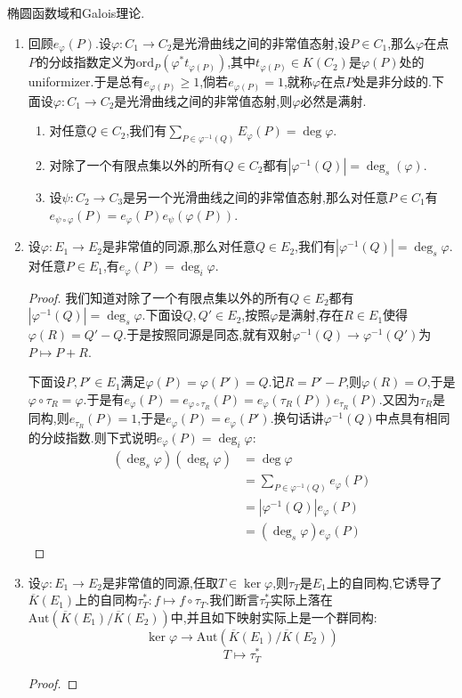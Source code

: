 椭圆函数域和Galois理论.
\begin{enumerate}
	\item 回顾$e_{\varphi}(P)$.设$\varphi:C_1\to C_2$是光滑曲线之间的非常值态射,设$P\in C_1$,那么$\varphi$在点$P$的分歧指数定义为$\mathrm{ord}_P(\varphi^*t_{\varphi(P)})$,其中$t_{\varphi(P)}\in K(C_2)$是$\varphi(P)$处的uniformizer.于是总有$e_{\varphi(P)}\ge1$,倘若$e_{\varphi(P)}=1$,就称$\varphi$在点$P$处是非分歧的.下面设$\varphi:C_1\to C_2$是光滑曲线之间的非常值态射,则$\varphi$必然是满射.
	\begin{enumerate}
		\item 对任意$Q\in C_2$,我们有$\sum_{P\in\varphi^{-1}(Q)}E_{\varphi}(P)=\deg\varphi$.
		\item 对除了一个有限点集以外的所有$Q\in C_2$都有$|\varphi^{-1}(Q)|=\deg_s(\varphi)$.
		\item 设$\psi:C_2\to C_3$是另一个光滑曲线之间的非常值态射,那么对任意$P\in C_1$有$e_{\psi\circ\varphi}(P)=e_{\varphi}(P)e_{\psi}(\varphi(P))$.
	\end{enumerate}
	\item 设$\varphi:E_1\to E_2$是非常值的同源,那么对任意$Q\in E_2$,我们有$|\varphi^{-1}(Q)|=\deg_s\varphi$.对任意$P\in E_1$,有$e_{\varphi}(P)=\deg_i\varphi$.
	\begin{proof}
		
		我们知道对除了一个有限点集以外的所有$Q\in E_2$都有$|\varphi^{-1}(Q)|=\deg_s\varphi$.下面设$Q,Q'\in E_2$,按照$\varphi$是满射,存在$R\in E_1$使得$\varphi(R)=Q'-Q$.于是按照同源是同态,就有双射$\varphi^{-1}(Q)\to\varphi^{-1}(Q')$为$P\mapsto P+R$.
		
		\qquad
		
		下面设$P,P'\in E_1$满足$\varphi(P)=\varphi(P')=Q$.记$R=P'-P$,则$\varphi(R)=O$,于是$\varphi\circ\tau_R=\varphi$.于是有$e_{\varphi}(P)=e_{\varphi\circ\tau_R}(P)=e_{\varphi}(\tau_R(P))e_{\tau_R}(P)$.又因为$\tau_R$是同构,则$e_{\tau_R}(P)=1$,于是$e_{\varphi}(P)=e_{\varphi}(P')$.换句话讲$\varphi^{-1}(Q)$中点具有相同的分歧指数.则下式说明$e_{\varphi}(P)=\deg_i\varphi$:
		\begin{align*}
			(\deg_s\varphi)(\deg_t\varphi)&=\deg\varphi\\&=\sum_{P\in\varphi^{-1}(Q)}e_{\varphi}(P)\\&=|\varphi^{-1}(Q)|e_{\varphi}(P)\\&=(\deg_s\varphi)e_{\varphi}(P)
		\end{align*}
	\end{proof}
	\item 设$\varphi:E_1\to E_2$是非常值的同源,任取$T\in\ker\varphi$,则$\tau_T$是$E_1$上的自同构,它诱导了$\overline{K}(E_1)$上的自同构$\tau_T^*:f\mapsto f\circ\tau_T$.我们断言$\tau_T^*$实际上落在$\mathrm{Aut}(\overline{K}(E_1)/\overline{K}(E_2))$中,并且如下映射实际上是一个群同构:
	$$\ker\varphi\to\mathrm{Aut}(\overline{K}(E_1)/\overline{K}(E_2))$$
	$$T\mapsto\tau_T^*$$
	\begin{proof}
		

\end{proof}
\end{enumerate}
